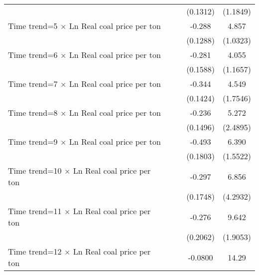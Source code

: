 {\begin{tabular}{l*{4}{c}}
                    &                     &                     &    (0.1312)         &    (1.1849)         \\
\addlinespace
Time trend=5 $\times$ Ln Real coal price per ton&                     &                     &      -0.288\sym{**} &       4.857\sym{***}\\
                    &                     &                     &    (0.1288)         &    (1.0323)         \\
\addlinespace
Time trend=6 $\times$ Ln Real coal price per ton&                     &                     &      -0.281\sym{*}  &       4.055\sym{***}\\
                    &                     &                     &    (0.1588)         &    (1.1657)         \\
\addlinespace
Time trend=7 $\times$ Ln Real coal price per ton&                     &                     &      -0.344\sym{**} &       4.549\sym{***}\\
                    &                     &                     &    (0.1424)         &    (1.7546)         \\
\addlinespace
Time trend=8 $\times$ Ln Real coal price per ton&                     &                     &      -0.236         &       5.272\sym{**} \\
                    &                     &                     &    (0.1496)         &    (2.4895)         \\
\addlinespace
Time trend=9 $\times$ Ln Real coal price per ton&                     &                     &      -0.493\sym{***}&       6.390\sym{***}\\
                    &                     &                     &    (0.1803)         &    (1.5522)         \\
\addlinespace
Time trend=10 $\times$ Ln Real coal price per ton&                     &                     &      -0.297\sym{*}  &       6.856         \\
                    &                     &                     &    (0.1748)         &    (4.2932)         \\
\addlinespace
Time trend=11 $\times$ Ln Real coal price per ton&                     &                     &      -0.276         &       9.642\sym{***}\\
                    &                     &                     &    (0.2062)         &    (1.9053)         \\
\addlinespace
Time trend=12 $\times$ Ln Real coal price per ton&                     &                     &     -0.0800         &       14.29         \\

\end{tabular}}
